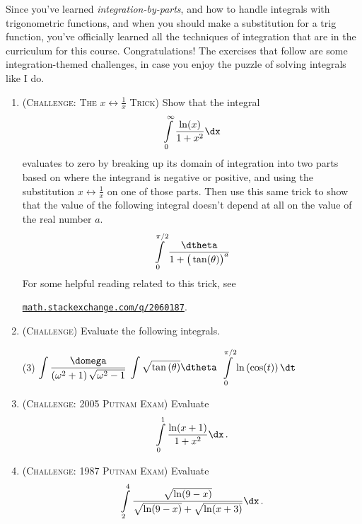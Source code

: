 \vspace{1em}
Since you've learned \emph{integration-by-parts},
and how to handle integrals with trigonometric functions,
and when you should make a substitution for a trig function,
you've officially learned all the techniques of integration 
that are in the curriculum for this course.
Congratulations! 
The exercises that follow are 
some integration-themed challenges,
in case you enjoy the puzzle of solving integrals like I do.

\begin{enumerate}[resume]
    \item (\textsc{Challenge: The $x \leftrightarrow \frac{1}{x}$ Trick})
        Show that the integral 
        \begin{equation*}
            \int\limits_{0}^{\infty} \frac{\ln(x)}{1+x^2} \dx
        \end{equation*}
        evaluates to zero by breaking up its domain of integration into two parts
        based on where the integrand is negative or positive,
        and using the substitution $x \leftrightarrow \frac{1}{x}$
        on one of those parts.
        Then use this same trick to show that the value of the following 
        integral doesn't depend at all on the value of the real number $a$.
        \begin{equation*}
            \int\limits_{0}^{\pi/2} \frac{\dtheta}{1+\big(\tan(\theta)\big)^a}
        \end{equation*}
        For some helpful reading related to this trick, see
        \begin{center}
            \href{https://math.stackexchange.com/q/2060187/167197}%
            {\texttt{math.stackexchange.com/q/2060187}}.
        \end{center}

    \item 
        (\textsc{Challenge})
        Evaluate the following integrals.
        \begin{tasks}(3)
            \task $\displaystyle\int\limits \frac{\domega}%
                {\left(\omega^2+1\right)\sqrt{\omega^2-1}} $
            \task $\displaystyle\int\limits \sqrt{\tan\left(\theta\right)} \dtheta $
            \task $\displaystyle\int\limits_{0}^{\pi/2} \ln\left(\cos(t)\right) \dt$
        \end{tasks}

    \item (\textsc{Challenge: 2005 Putnam Exam}) Evaluate
        \begin{equation*}
            \int\limits_0^1 \frac{\ln(x+1)}{1+x^2} \dx
            \,.
        \end{equation*}

    \item (\textsc{Challenge: 1987 Putnam Exam}) Evaluate
        \begin{equation*}
            \int\limits_2^4 \frac{\sqrt{\ln(9-x)}}%
                {\sqrt{\ln(9-x)}+\sqrt{\ln(x+3)}} \dx
            \,.
        \end{equation*}

\end{enumerate}

